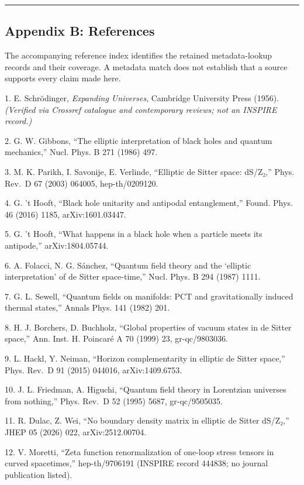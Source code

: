 \documentclass[
]{article}
\begin{document}
\begin{center}\rule{0.5\linewidth}{0.5pt}\end{center}

\subsection{Appendix B: References}\label{appendix-b-references}

The accompanying reference index identifies the retained metadata-lookup
records and their coverage. A metadata match does not establish that a
source supports every claim made here.

1. E. Schrödinger, \emph{Expanding Universes}, Cambridge University
Press (1956). \emph{(Verified via Crossref catalogue and contemporary
reviews; not an INSPIRE record.)}

2. G. W. Gibbons, ``The elliptic interpretation of black holes and
quantum mechanics,'' Nucl. Phys. B 271 (1986) 497.

3. M. K. Parikh, I. Savonije, E. Verlinde, ``Elliptic de Sitter space:
dS/Z₂,'' Phys. Rev.~D 67 (2003) 064005, hep-th/0209120.

4. G. 't Hooft, ``Black hole unitarity and antipodal entanglement,''
Found. Phys. 46 (2016) 1185, arXiv:1601.03447.

5. G. 't Hooft, ``What happens in a black hole when a particle meets its
antipode,'' arXiv:1804.05744.

6. A. Folacci, N. G. Sánchez, ``Quantum field theory and the `elliptic
interpretation' of de Sitter space-time,'' Nucl. Phys. B 294 (1987)
1111.

7. G. L. Sewell, ``Quantum fields on manifolds: PCT and gravitationally
induced thermal states,'' Annals Phys. 141 (1982) 201.

8. H. J. Borchers, D. Buchholz, ``Global properties of vacuum states in
de Sitter space,'' Ann. Inst. H. Poincaré A 70 (1999) 23, gr-qc/9803036.

9. L. Hackl, Y. Neiman, ``Horizon complementarity in elliptic de Sitter
space,'' Phys. Rev.~D 91 (2015) 044016, arXiv:1409.6753.

10. J. L. Friedman, A. Higuchi, ``Quantum field theory in Lorentzian
universes from nothing,'' Phys. Rev.~D 52 (1995) 5687, gr-qc/9505035.

11. R. Dulac, Z. Wei, ``No boundary density matrix in elliptic de Sitter
dS/Z₂,'' JHEP 05 (2026) 022, arXiv:2512.00704.

12. V. Moretti, ``Zeta function renormalization of one-loop stress
tensors in curved spacetimes,'' hep-th/9706191 (INSPIRE record 444838;
no journal publication listed).
\end{document}
